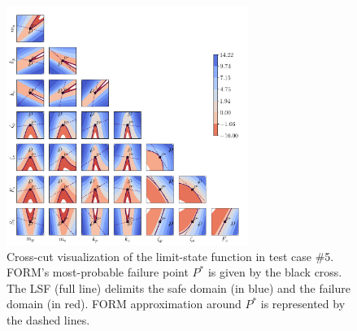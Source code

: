 \begin{figure}
    \centering
    \includegraphics[width=0.7\textwidth]{part3/figures/BANCS/crosscut_oscillator.png}
    \caption{Cross-cut visualization of the limit-state function in test case \#5. 
    FORM's most-probable failure point $P^*$ is given by the black cross. 
    The LSF (full line) delimits the safe domain (in blue) and the failure domain (in red). 
    FORM approximation around $P^*$ is represented by the dashed lines.}
    \label{fig:crosscut_oscillator}
\end{figure}


